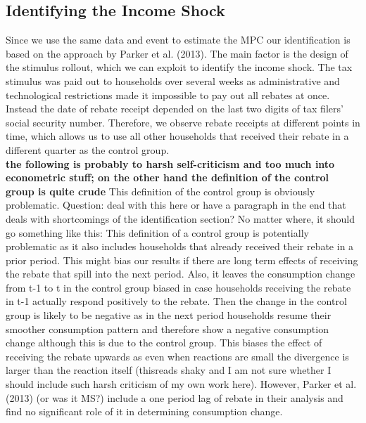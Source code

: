 \subsection{Identifying the Income Shock} \label{subsec:identification}
Since we use the same data and event to estimate the MPC our identification is based on the approach by Parker et al. (2013). The main factor is the design of the stimulus rollout, which we can exploit to identify the income shock. The tax stimulus was paid out to households over several weeks as administrative and technological restrictions made it impossible to pay out all rebates at once. Instead the date of rebate receipt depended on the last two digits of tax filers' social security number. Therefore, we observe rebate receipts at different points in time, which allows us to use all other households that received their rebate in a different quarter as the control group. \\
\textbf{the following is probably to harsh self-criticism and too much into econometric stuff; on the other hand the definition of the control group is quite crude}
This definition of the control group is obviously problematic. Question: deal with this here or have a paragraph in the end that deals with shortcomings of the identification section? No matter where, it should go something like this: 
This definition of a control group is potentially problematic as it also includes households that already received their rebate in a prior period. This might bias our results if there are long term effects of receiving the rebate that spill into the next period. Also, it leaves the consumption change from t-1 to t in the control group biased in case households receiving the rebate in t-1  actually respond positively to the rebate. Then the change in the control group is likely to be negative as in the next period households resume their smoother consumption pattern and therefore show a negative consumption change although this is due to the control group. This biases the effect of receiving the rebate upwards as even when reactions are small the divergence is larger than the reaction itself (thisreads shaky and I am not sure whether I should include such harsh criticism of my own work here).
However, Parker et al. (2013) (or was it MS?) include a one period lag of rebate in their analysis and find no significant role of it in determining consumption change. 
\\
